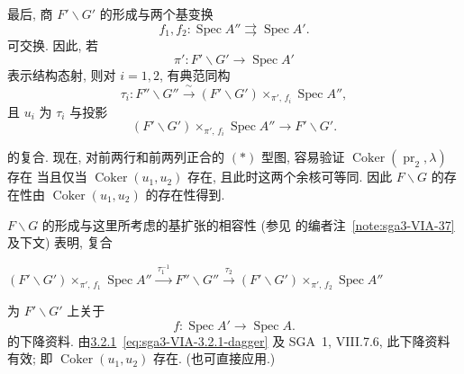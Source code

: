 最后, 商 \(F'\backslash G'\) 的形成与两个基变换
\[
  f_1,f_2:\operatorname{Spec}A''
    \rightrightarrows \operatorname{Spec}A'.
\]
可交换. 因此, 若
\[
  \pi':F'\backslash G'\longrightarrow\operatorname{Spec}A'
\]
表示结构态射, 则对 \(i=1,2\), 有典范同构
\[
  \tau_i:F''\backslash G''
    \xrightarrow{\ \sim\ }
    (F'\backslash G')\times_{\pi',\,f_i}\operatorname{Spec}A'',
\]
且 \(u_i\) 为 \(\tau_i\) 与投影
\[
  (F'\backslash G')\times_{\pi',\,f_i}\operatorname{Spec}A''
    \longrightarrow F'\backslash G'.
\]

的复合. 现在, 对前两行和前两列正合的 \((*)\) 型图,
容易验证 \(\operatorname{Coker}(\operatorname{pr}_2,\lambda)\) 存在
当且仅当 \(\operatorname{Coker}(u_1,u_2)\) 存在, 且此时这两个余核可等同.
因此 \(F\backslash G\) 的存在性由 \(\operatorname{Coker}(u_1,u_2)\) 的存在性得到.

\(F\backslash G\) 的形成与这里所考虑的基扩张的相容性
(参见 的编者注~\ref{note:sga3-VIA-37}
及下文) 表明, 复合
\begin{center}
  \label{diag:sga3-VIA-3.2.3-descent-datum}%
  \(
  (F'\backslash G')\times_{\pi',\,f_1}\operatorname{Spec}A''
    \xrightarrow{\ \tau_1^{-1}\ }
  F''\backslash G''
    \xrightarrow{\ \tau_2\ }
  (F'\backslash G')\times_{\pi',\,f_2}\operatorname{Spec}A''
  \)
\end{center}
为 \(F'\backslash G'\) 上关于
\[
  f:\operatorname{Spec}A'\longrightarrow\operatorname{Spec}A.
\]
的下降资料. 由\hyperref[par:sga3-VIA-3.2.1]{3.2.1}~\eqref{eq:sga3-VIA-3.2.1-dagger}
及 SGA~1, VIII.7.6, 此下降资料有效;
即 \(\operatorname{Coker}(u_1,u_2)\) 存在.
(也可直接应用.)
